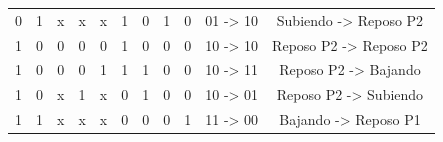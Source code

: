 \begin{center}
\begin{tabular}{cc|ccc|cc|cc|cc}
0                                            & 1                                           & x                           & x                           & x                         & 1                                             & 0                                             & 1                                         & 0                                        & 01 -\textgreater{} 10                  & Subiendo -\textgreater{} Reposo P2                  \\
1                                            & 0                                           & 0                           & 0                           & 0                         & 1                                             & 0                                             & 0                                         & 0                                        & 10 -\textgreater{} 10                  & Reposo P2 -\textgreater{} Reposo P2                 \\
1                                            & 0                                           & 0                           & 0                           & 1                         & 1                                             & 1                                             & 0                                         & 0                                        & 10 -\textgreater{} 11                  & Reposo P2 -\textgreater{} Bajando                   \\
1                                            & 0                                           & x                           & 1                           & x                         & 0                                             & 1                                             & 0                                         & 0                                        & 10 -\textgreater{} 01                  & Reposo P2 -\textgreater{} Subiendo                  \\
1                                            & 1                                           & x                           & x                           & x                         & 0                                             & 0                                             & 0                                         & 1                                        & 11 -\textgreater{} 00                  & Bajando -\textgreater{} Reposo P1                  
\end{tabular}
\end{center}
